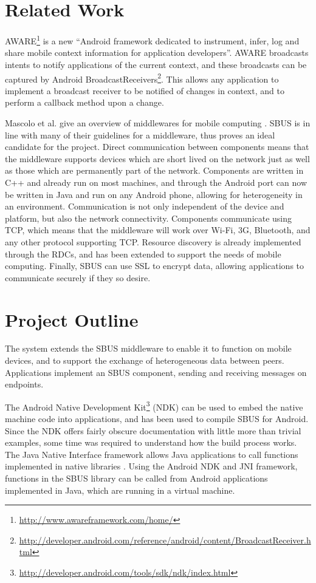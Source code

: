 \documentclass[12pt,twoside,notitlepage]{report}
\begin{document}
\section{Related Work}

AWARE\footnote{\url{http://www.awareframework.com/home/}} is a new ``Android framework dedicated to instrument, infer, log and share mobile context information for application developers''. 
AWARE broadcasts intents to notify applications of the current context, and these broadcasts can be captured by Android BroadcastReceivers\footnote{\url{http://developer.android.com/reference/android/content/BroadcastReceiver.html}}. 
This allows any application to implement a broadcast receiver to be notified of changes in context, and to perform a callback method upon a change. 

Mascolo et al. give an overview of middlewares for mobile computing \cite{mascolo2002mobile}. 
SBUS is in line with many of their guidelines for a middleware, thus proves an ideal candidate for the project. 
Direct communication between components means that the middleware supports devices which are short lived on the network just as well as those which are permanently part of the network. 
Components are written in C++ and already run on most machines, and through the Android port can now be written in Java and run on any Android phone, allowing for heterogeneity in an environment. 
Communication is not only independent of the device and platform, but also the network connectivity. 
Components communicate using TCP, which means that the middleware will work over Wi-Fi, 3G, Bluetooth, and any other protocol supporting TCP. 
Resource discovery is already implemented through the RDCs, and has been extended to support the needs of mobile computing. 
Finally, SBUS can use SSL to encrypt data, allowing applications to communicate securely if they so desire. 


\section{Project Outline}

The system extends the SBUS middleware to enable it to function on mobile devices, and to support the exchange of heterogeneous data between peers. 
Applications implement an SBUS component, sending and receiving messages on endpoints. 

The Android Native Development Kit\footnote{\url{http://developer.android.com/tools/sdk/ndk/index.html}} (NDK) can be used to embed the native machine code into applications, and has been used to compile SBUS for Android. 
Since the NDK offers fairly obscure documentation with little more than trivial examples, some time was required to understand how the build process works. 
The Java Native Interface framework allows Java applications to call functions implemented in native libraries \cite{liang1999java}. 
Using the Android NDK and JNI framework, functions in the SBUS library can be called from Android applications implemented in Java, which are running in a virtual machine. 
\end{document}

